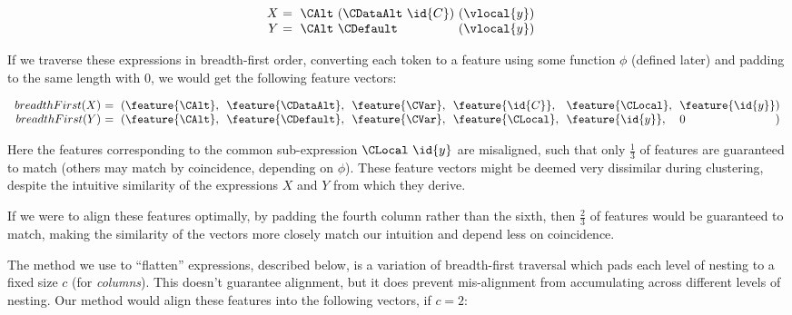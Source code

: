 \begin{equation*}\label{eq:xy}
  \begin{array}{r@{}l@{}l@{}}
    X\ &=\ \CAlt\ (\CDataAlt\ \id{C})\ & (\vlocal{y}) \\
    Y\ &=\ \CAlt\ \CDefault\           & (\vlocal{y})
  \end{array}
\end{equation*}

If we traverse these expressions in breadth-first order, converting each token
to a feature using some function $\phi$ (defined later) and padding to the same
length with $0$, we would get the following feature vectors:

\begin{small}
  \begin{equation*}
    \begin{array}{r@{}l@{}l@{}l@{}l@{}l@{}l@{}l}
      breadthFirst(X)\ &=\ (\feature{\CAlt},\
                           \ &\feature{\CDataAlt},\
                           \ &\feature{\CVar},\
                           \ &\feature{\id{C}},\
                           \ &\feature{\CLocal},\
                           \ &\feature{\id{y}} &) \\
      breadthFirst(Y)\ &=\ (\feature{\CAlt},\
                           \ &\feature{\CDefault},\
                           \ &\feature{\CVar},\
                           \ &\feature{\CLocal},\
                           \ &\feature{\id{y}},\
                           \ &0 &)
    \end{array}
  \end{equation*}
\end{small}

Here the features corresponding to the common sub-expression $\CLocal\ \id{y}$
are misaligned, such that only $\frac{1}{3}$ of features are guaranteed to match
(others may match by coincidence, depending on $\phi$). These feature vectors
might be deemed very dissimilar during clustering, despite the intuitive
similarity of the expressions $X$ and $Y$ from which they derive.

If we were to align these features optimally, by padding the fourth column
rather than the sixth, then $\frac{2}{3}$ of features would be guaranteed to
match, making the similarity of the vectors more closely match our intuition and
depend less on coincidence.

The method we use to ``flatten'' expressions, described below, is a variation of
breadth-first traversal which pads each level of nesting to a fixed size $c$
(for \emph{columns}). This doesn't guarantee alignment, but it does prevent
mis-alignment from accumulating across different levels of nesting. Our method
would align these features into the following vectors, if $c = 2$:

